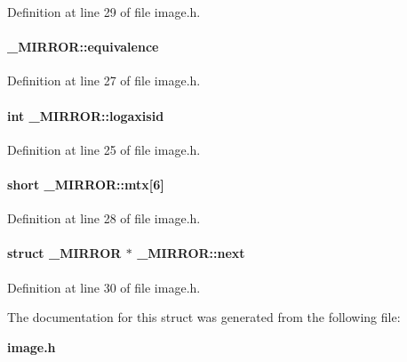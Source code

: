Definition at line 29 of file image.h.\label{_MIRROR_m3}
\paragraph{ \_\-MIRROR::equivalence}\hfill



Definition at line 27 of file image.h.\label{_MIRROR_m1}
\paragraph{\setlength{\rightskip}{0pt plus 5cm}int \_\-MIRROR::logaxisid}\hfill



Definition at line 25 of file image.h.\label{_MIRROR_m4}
\paragraph{\setlength{\rightskip}{0pt plus 5cm}short \_\-MIRROR::mtx[6]}\hfill



Definition at line 28 of file image.h.\label{_MIRROR_m6}
\paragraph{\setlength{\rightskip}{0pt plus 5cm}struct \_\-MIRROR $\ast$ \_\-MIRROR::next}\hfill



Definition at line 30 of file image.h.

The documentation for this struct was generated from the following file:\begin{CompactItemize}
\item 
{\bf image.h}\end{CompactItemize}
